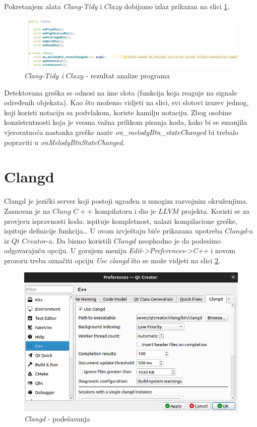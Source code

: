 \documentclass[a4paper]{article}
\begin{document}
Pokretanjem alata \textit{Clang-Tidy} i $Clazy$ dobijamo izlaz prikazan na slici \ref{fig:cc3}.
	\begin{figure}[h!]
		\caption{\textit{\textit{Clang-Tidy} i $Clazy$} - rezultat analize programa}
		\label{fig:cc3}
		\includegraphics[scale=0.5]{cc3.png}
	\end{figure}
	
	Detektovana greška se odnosi na ime slota (funkcija koja reaguje na signale određenih objekata). Kao što možemo vidjeti na slici, svi slotovi izuzev jednog, koji koristi notaciju sa podvlakom, koriste kamilju notaciju. Zbog osobine konzistentnosti koja je veoma važna prilikom pisanja koda, kako bi se smanjila vjerovatnoća nastanka greške naziv \textit{on\_melodyBtn\_stateChanged} bi trebalo popraviti u \textit{onMelodyBtnStateChanged}.
	
	\section{Clangd}
	
	Clangd je jezički server koji postoji ugrađen u mnogim razvojnim okruženjima. Zasnovan je na $Clang$ $C++$ kompilatoru i dio je $LLVM$ projekta. Koristi se za provjeru ispravnosti koda: ispituje kompletnost, nalazi kompilacione greške, ispituje definicije funkcija… U ovom izvještaju biće prikazana upotreba $Clangd$-a iz $Qt$ $Creator$-a.
Da bismo koristili $Clangd$ neophodno je da podesimo odgovarajuću opciju. U gornjem meniju \textit{Edit->Preferences->C++} i novom prozoru treba označiti opciju \textit{Use clangd} što se može vidjeti na slici \ref{fig:c1}.
	 \begin{figure}[h!]
		\caption{\textit{Clangd} - podešavanja}
		\label{fig:c1}
		\includegraphics[scale=0.5]{c1.png}
	\end{figure}
	
\end{document}
